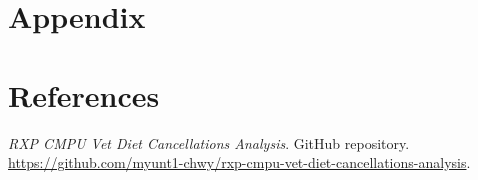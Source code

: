 \documentclass[
  10pt,
]{article}
\begin{document}
\section{Appendix}\label{appendix}
\localtableofcontents







\section{References}\label{references}
\begin{enumerate}[label={[\arabic*]},leftmargin=*]
\item \label{ref:analysis-repository}\emph{RXP CMPU Vet Diet Cancellations Analysis}. GitHub repository. \url{https://github.com/myunt1-chwy/rxp-cmpu-vet-diet-cancellations-analysis}.
\end{enumerate}
\end{document}
